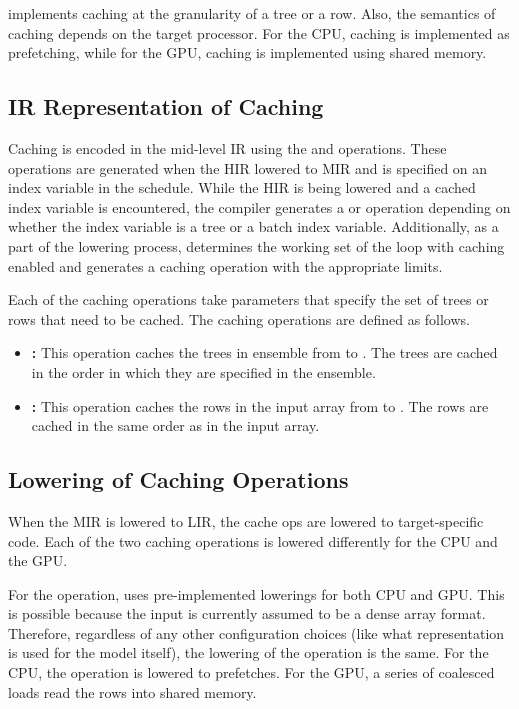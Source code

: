 \Treebeard{} implements caching at the granularity of a tree or a row.
Also, the semantics of caching depends on the target processor. For the CPU,
caching is implemented as prefetching, while for the GPU, caching is implemented
using shared memory.

\subsection{IR Representation of Caching}
Caching is encoded in the mid-level IR using the  and  operations. 
These operations are generated when the HIR lowered to MIR and  is specified on an 
index variable in the schedule. While the HIR is being lowered and a cached index variable is 
encountered, the compiler generates a  or  operation depending on 
whether the index variable is a tree or a batch index variable. Additionally, as a part of the 
lowering process, \Treebeard{} determines the working set of the loop with caching enabled 
and generates a caching operation with the appropriate limits.

Each of the caching operations take parameters that specify the set of trees or rows that need 
to be cached. The caching operations are defined as follows. 
\begin{itemize}
  \item \textbf{:} This operation caches the trees in ensemble
   from  to . The trees are cached in the order in which they are
  specified in the ensemble. 
  \item \textbf{:} This operation caches the rows in the input 
  array  from  to . The rows are cached in the same order as in the
  input array.
\end{itemize} 

\subsection{Lowering of Caching Operations}
When the MIR is lowered to LIR, the cache ops are lowered to target-specific code. Each of 
the two caching operations is lowered differently for the CPU and the GPU.

For the  operation, \Treebeard{} uses pre-implemented lowerings for both
CPU and GPU. This is possible because the input is currently assumed to be a dense
array format. Therefore, regardless of any other configuration choices (like what representation 
is used for the model itself), the lowering of the  operation is the same. 
For the CPU, the  operation is lowered to prefetches. For the GPU, a 
series of coalesced loads read the rows into shared memory.

